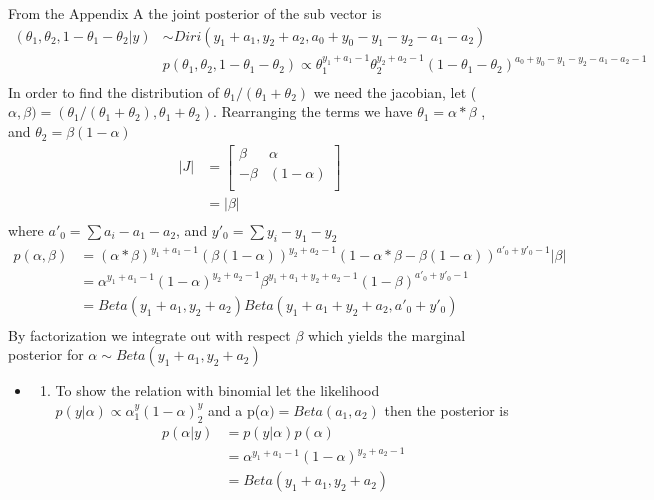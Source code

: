 \documentclass[
]{book}
\providecommand{\tightlist}{%
  \setlength{\itemsep}{0pt}\setlength{\parskip}{0pt}}
\theoremstyle{definition}
\theoremstyle{definition}
\theoremstyle{definition}
\theoremstyle{definition}
\theoremstyle{remark}
\begin{document}
From the Appendix A the joint posterior of the sub vector is
\[
\begin{aligned}
(\theta_1, \theta_2, 1-\theta_1-\theta_2| y ) &\sim Diri(y_1+a_1,y_2+a_2, a_0+y_0-y_1-y_2-a_1-a_2)\\
&p(\theta_1,\theta_2,1-\theta_1-\theta_2) \propto \theta_1^{y_1+a_1-1}\theta_2^{y_2+a_2-1}(1-\theta_1-\theta_2)^{a_0+y_0-y_1-y_2-a_1-a_2-1}\\
\end{aligned}
\]
In order to find the distribution of \(\theta_1/(\theta_1+\theta_2)\) we need the jacobian, let (\(\alpha,\beta) = (\theta_1/(\theta_1+\theta_2) , \theta_1+\theta_2)\).
Rearranging the terms we have \(\theta_1 = \alpha*\beta\) , and \(\theta_2= \beta(1-\alpha)\)
\[
\begin{aligned}
|J| &= \begin{bmatrix}
 \beta & \alpha \\
 -\beta & (1-\alpha)\\
\end{bmatrix} \\
 &=|\beta|\\
\end{aligned}
\]
where \(a'_0 = \sum a_i -a_1 -a_2\), and \(y'_0 =\sum y_i-y_1-y_2\)
\[
\begin{aligned}
p(\alpha,\beta) &= (\alpha*\beta)^{y_1+a_1-1}(\beta(1-\alpha))^{y_2+a_2-1}(1-\alpha*\beta-\beta(1-\alpha))^{a'_0+y'_0-1}|\beta|\\
&=\alpha^{y_1+a_1-1}(1-\alpha)^{y_2+a_2-1}\beta^{y_1+a_1+y_2+a_2-1}(1-\beta)^{a'_0+y'_0-1}\\
&= Beta(y_1+a_1,y_2+a_2)Beta(y_1+a_1+y_2+a_2, a'_0+y'_0)\\
\end{aligned}
\]
By factorization we integrate out with respect \(\beta\) which yields the marginal posterior for \(\alpha \sim Beta(y_1+a_1,y_2+a_2)\)

\begin{itemize}
\item
  \begin{enumerate}
  \def\labelenumi{(\alph{enumi})}
  \setcounter{enumi}{1}
  \tightlist
  \item
    To show the relation with binomial let the likelihood \(p(y|\alpha) \propto \alpha^y_1 (1-\alpha)^y_2\) and a p(\(\alpha)=Beta(a_1,a_2)\) then the posterior is
    \[
    \begin{aligned}
    p(\alpha | y) &= p(y|\alpha)p(\alpha)\\
    &= \alpha^{y_1+a_1-1}(1-\alpha)^{y_2+a_2-1}\\
    &= Beta(y_1+a_1,y_2+a_2)
    \end{aligned}
    \]
  \end{enumerate}
\end{itemize}
\end{document}
